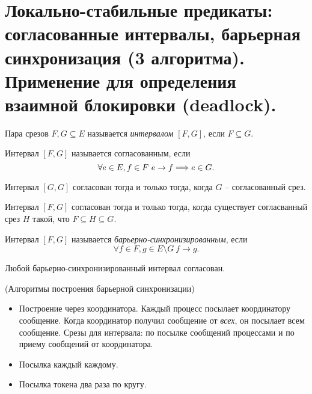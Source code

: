 \section{Локально-стабильные предикаты: согласованные интервалы, барьерная 
синхронизация (3 алгоритма). Применение для определения взаимной блокировки 
(deadlock).}

\begin{definition}
    Пара срезов $F, G \subseteq E$ называется \textit{интервалом} $[F, G]$,
    если $F \subseteq G$.
\end{definition}

\begin{definition}
    Интервал $[F, G]$ называется согласованным, если
    \[
        \forall e \in E, f \in F~ e \to f \Longrightarrow e \in G
    .\]
\end{definition}

\begin{remark}
    Интервал $[G, G]$ согласован тогда и только тогда, когда $G$ -- согласованный
    срез.
\end{remark}

\begin{theorem}
    Интервал $[F, G]$ согласован тогда и только тогда, когда существует согласванный
    срез $H$ такой, что $F \subseteq H \subseteq G$.
\end{theorem}

\begin{definition}
    Интервал $[F, G]$ называется \textit{барьерно-синхронизированным}, если
    \[
        \forall f \in F, g \in E \setminus G~ f \to g
    .\]
\end{definition}

\begin{theorem}
    Любой барьерно-синхронизированный интервал согласован.
\end{theorem}

\begin{algorithm}(Алгоритмы построения барьерной синхронизации)
    \enewline
    \begin{itemize}
        \item Построение через координатора. Каждый процесс посылает
            координатору сообщение. Когда координатор получил сообщение
            от \textit{всех}, он посылает всем сообщение. Срезы для интервала:
            по посылке сообщений процессами и по приему сообщений от координатора.
        \item Посылка каждый каждому.
        \item Посылка токена два раза по кругу.
    \end{itemize}
\end{algorithm}

